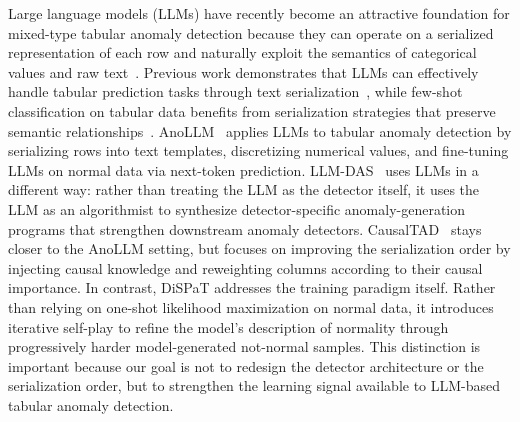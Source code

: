Large language models (LLMs) have recently become an attractive foundation for mixed-type tabular anomaly detection because they can operate on a serialized representation of each row and naturally exploit the semantics of categorical values and raw text~\cite{dinh2022lift, hegselmann2023tabllm}. Previous work demonstrates that LLMs can effectively handle tabular prediction tasks through text serialization~\cite{dinh2022lift}, while few-shot classification on tabular data benefits from serialization strategies that preserve semantic relationships~\cite{hegselmann2023tabllm}. AnoLLM~\cite{tsai2025anollm} applies LLMs to tabular anomaly detection by serializing rows into text templates, discretizing numerical values, and fine-tuning LLMs on normal data via next-token prediction. LLM-DAS~\citep{ye2026llmdas} uses LLMs in a different way: rather than treating the LLM as the detector itself, it uses the LLM as an algorithmist to synthesize detector-specific anomaly-generation programs that strengthen downstream anomaly detectors. CausalTAD~\citep{wang2026causaltad} stays closer to the AnoLLM setting, but focuses on improving the serialization order by injecting causal knowledge and reweighting columns according to their causal importance. In contrast, DiSPaT addresses the training paradigm itself. Rather than relying on one-shot likelihood maximization on normal data, it introduces iterative self-play to refine the model's description of normality through progressively harder model-generated not-normal samples. This distinction is important because our goal is not to redesign the detector architecture or the serialization order, but to strengthen the learning signal available to LLM-based tabular anomaly detection.

